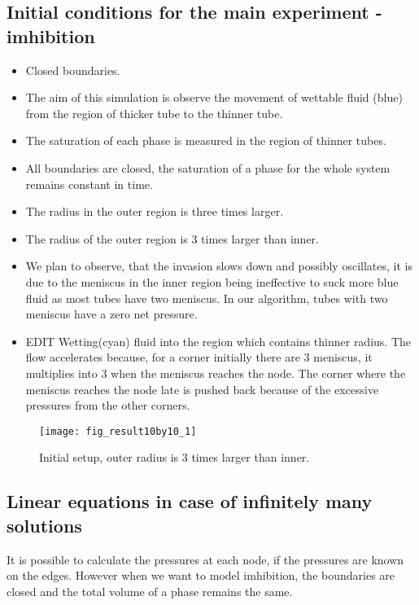 \subsection{Initial conditions for the main experiment - imhibition}

	\begin{itemize}
		\item Closed boundaries.
		\item The aim of this simulation is observe the movement of wettable fluid (blue) from the region of thicker tube to the thinner tube.
		\item The saturation of each phase is measured in the region of thinner tubes.
		\item All boundaries are closed, the saturation of a phase for the whole system remains constant in time.
		\item The radius in the outer region is three times larger.
		\item The radius of the outer region is 3 times larger than inner.
		\item We plan to observe, that the invasion slows down and possibly oscillates, it is due to the meniscus in the inner region being ineffective to suck more blue fluid as most tubes have two meniscus. In our algorithm, tubes with two meniscus have a zero net pressure.
		\item EDIT Wetting(cyan) fluid into the region which contains thinner radius. The flow accelerates because, for a corner initially there are 3 meniscus, it multiplies into 3 when the meniscus reaches the node. The corner where the meniscus reaches the node late is pushed back because of the excessive pressures from the other corners.
	\end{itemize}
	
	\begin{figure}[H]
		\texttt{[image: fig\_result10by10\_1]}
		\caption{Initial setup, outer radius is 3 times larger than inner.}
		\label{fig_invasion-result1}
	\end{figure}	

	
\subsection{Linear equations in case of infinitely many solutions}
	It is possible to calculate the pressures at each node, if the pressures are known on the edges. However when we want to model imhibition, the boundaries are closed and the total volume of a phase remains the same.
	
